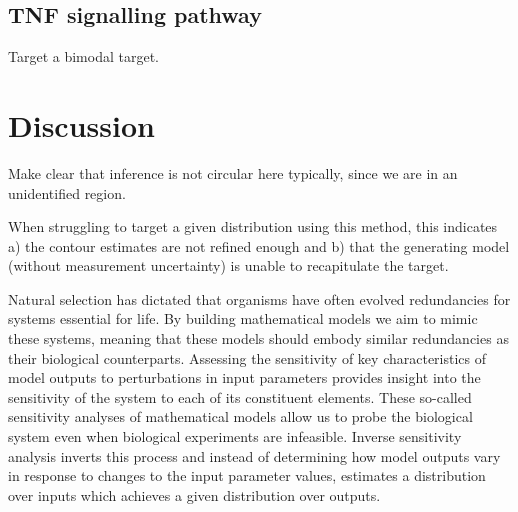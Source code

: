 \documentclass[10pt,letterpaper]{article}
\begin{document}
\subsection{TNF signalling pathway}
Target a bimodal target.


\section{Discussion}
\label{sec:discussion}

Make clear that inference is not circular here typically, since we are in an unidentified region.

When struggling to target a given distribution using this method, this indicates a) the contour estimates are not refined enough and b) that the generating model (without measurement uncertainty) is unable to recapitulate the target.

Natural selection has dictated that organisms have often evolved redundancies for systems essential for life. By building mathematical models we aim to mimic these systems, meaning that these models should embody similar redundancies as their biological counterparts. Assessing the sensitivity of key characteristics of model outputs to perturbations in input parameters provides insight into the sensitivity of the system to each of its constituent elements. These so-called sensitivity analyses of mathematical models allow us to probe the biological system even when biological experiments are infeasible. Inverse sensitivity analysis inverts this process and instead of determining how model outputs vary in response to changes to the input parameter values, estimates a distribution over inputs which achieves a given distribution over outputs.
\end{document}
